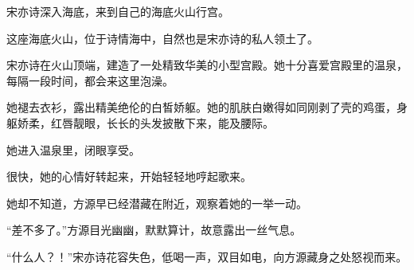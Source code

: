 \begin{this_body}
宋亦诗深入海底，来到自己的海底火山行宫。

这座海底火山，位于诗情海中，自然也是宋亦诗的私人领土了。

宋亦诗在火山顶端，建造了一处精致华美的小型宫殿。她十分喜爱宫殿里的温泉，每隔一段时间，都会来这里泡澡。

她褪去衣衫，露出精美绝伦的白皙娇躯。她的肌肤白嫩得如同刚剥了壳的鸡蛋，身躯娇柔，红唇靓眼，长长的头发披散下来，能及腰际。

她进入温泉里，闭眼享受。

很快，她的心情好转起来，开始轻轻地哼起歌来。

她却不知道，方源早已经潜藏在附近，观察着她的一举一动。

“差不多了。”方源目光幽幽，默默算计，故意露出一丝气息。

“什么人？！”宋亦诗花容失色，低喝一声，双目如电，向方源藏身之处怒视而来。

\end{this_body}

